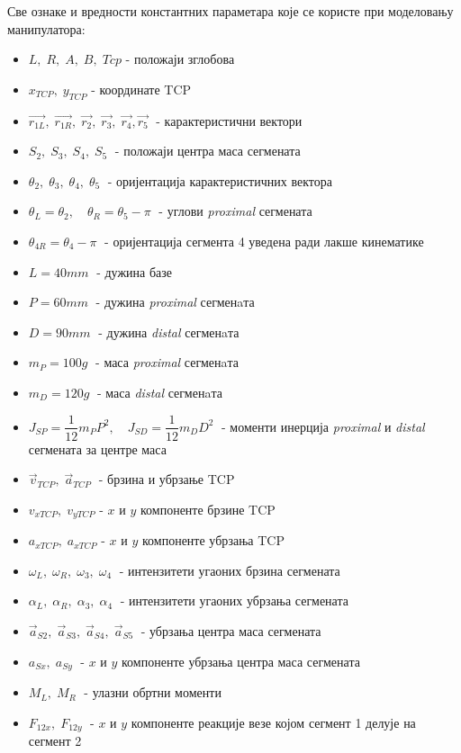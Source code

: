 \documentclass[12pt]{article}
\begin{document}
Све ознаке и вредности константних параметара које се користе при моделовању манипулатора:
\begin{itemize}
    \item $L,\; R,\; A,\; B,\; Tcp$ - положаји зглобова
    \item $x_{TCP},\;y_{TCP}$ - координате TCP
    \item $\vec{r_{1L}},\; \vec{r_{1R}},\; \vec{r_{2}},\; \vec{r_{3}},\; \vec{r_{4}}, \vec{r_{5}}\;$ - карактеристични вектори
    \item $S_2,\; S_3,\; S_4,\; S_5\;$ - положаји центра маса сегмената
    \item $\theta_2,\; \theta_3,\; \theta_4,\; \theta_5\;$ - оријентација карактеристичних вектора
    \item $\theta_L = \theta_2, \quad \theta_R = \theta_5-\pi\;$ - углови \textit{proximal} сегмената
    \item $\theta_{4R} = \theta_4-\pi\;$ - оријентација сегмента 4 уведена ради лакше кинематике
    \item $L = 40mm\;$ - дужина базе
    \item $P = 60mm\;$ - дужина \textit{proximal} сегменaта
    \item $D = 90mm\;$ - дужина \textit{distal} сегменaта
    \item $m_P = 100g\;$ - маса \textit{proximal} сегменaта
    \item $m_D = 120g\;$ - маса \textit{distal} сегменaта
    \item $J_{SP} = \dfrac{1}{12} m_P P ^ 2,\quad J_{SD} = \dfrac{1}{12} m_D D ^ 2\;$ - моменти инерција \textit{proximal} и \textit{distal} сегмената за центре маса
    \item $\vec{v}_{TCP},\; \vec{a}_{TCP}\;$ - брзина и убрзање TCP
    \item $v_{xTCP},\;v_{yTCP}$ - $x$ и $y$ компоненте брзине  TCP
    \item $a_{xTCP},\;a_{xTCP}$ - $x$ и $y$ компоненте убрзања TCP
    \item $\omega_L,\; \omega_R,\; \omega_3,\; \omega_4\;$ - интензитети угаоних брзина сегмената
    \item $\alpha_L,\; \alpha_R,\; \alpha_3,\; \alpha_4\;$ - интензитети угаоних убрзања сегмената
    \item $\vec{a}_{S2},\; \vec{a}_{S3},\; \vec{a}_{S4},\; \vec{a}_{S5}\;$ - убрзања центра маса сегмената
    \item $a_{Sx},\; a_{Sy}\;$ - $x$ и $y$ компоненте убрзања центра маса сегмената
    \item $M_L,\;M_R\;$ - улазни обртни моменти
    \item $F_{12x},\; F_{12y}\;$ - $x$ и $y$ компоненте реакције везе којом сегмент 1 делује на сегмент 2
\end{itemize}
\end{document}

